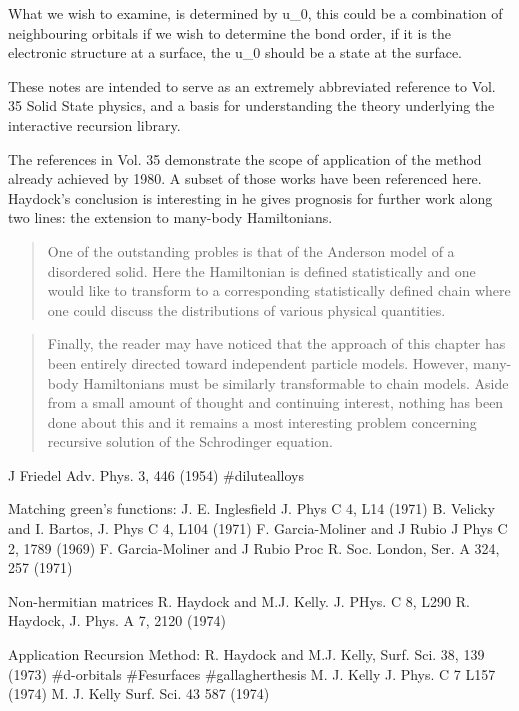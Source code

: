 What we wish to examine, is determined by u_{0}, this could be a combination
of neighbouring orbitals if we wish to determine the bond order, if it is the electronic
structure at a surface, the u_{0} should be a state at the surface.

These notes are intended to serve as an extremely abbreviated reference 
to Vol. 35 Solid State physics, and a basis for understanding the theory 
underlying the interactive recursion library.

The references in Vol. 35 demonstrate the scope of application of the method 
already achieved by 1980. A subset of those works have been referenced here. 
Haydock's conclusion is interesting in he gives prognosis for further work
along two lines: the extension to many-body Hamiltonians.

\begin{quote}
One of the outstanding probles is that of the Anderson model
of a disordered solid. Here the Hamiltonian is defined statistically and
one would like to transform to a corresponding statistically defined chain where
one could discuss the distributions of various physical quantities.
\end{quote}

\begin{quote}
Finally, the reader may have noticed that the approach of this chapter has been entirely directed
toward independent particle models. However, many-body Hamiltonians must be similarly 
transformable to chain models. Aside from a small amount of thought and continuing interest, 
nothing has been done about this and it remains a most interesting problem concerning
recursive solution of the Schrodinger equation.
\end{quote}


J Friedel Adv. Phys. 3, 446 (1954) #dilutealloys

Matching green's functions:
J. E. Inglesfield J. Phys C 4, L14 (1971)
B. Velicky and I. Bartos, J. Phys C 4, L104 (1971)
F. Garcia-Moliner and J Rubio J Phys C 2, 1789 (1969)
F. Garcia-Moliner and J Rubio Proc R. Soc. London, Ser. A 324, 257 (1971)

Non-hermitian matrices
R. Haydock and M.J. Kelly. J. PHys. C 8, L290
R. Haydock, J. Phys. A 7, 2120 (1974)

Application Recursion Method:
R. Haydock and M.J. Kelly, Surf. Sci. 38, 139 (1973) #d-orbitals #Fesurfaces #gallagherthesis
M. J. Kelly J. Phys. C 7 L157 (1974)
M. J. Kelly Surf. Sci. 43 587 (1974)

